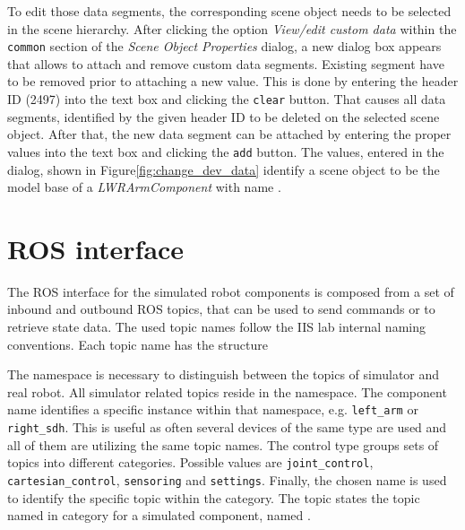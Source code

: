 To edit those data segments, the corresponding scene object needs to be selected in the scene hierarchy. After clicking the option \emph{View/edit custom data} within the \texttt{common} section of the \emph{Scene Object Properties} dialog, a new dialog box appears that allows to attach and remove custom data segments. Existing segment have to be removed prior to attaching a new value. This is done by entering the header ID (2497) into the text box and clicking the \texttt{clear} button. That causes all data segments, identified by the given header ID to be deleted on the selected scene object. After that, the new data segment can be attached by entering the proper values into the text box and clicking the \texttt{add} button. The values, entered in the dialog, shown in Figure\ref{fig:change_dev_data} identify a scene object to be the model base of a \emph{LWRArmComponent} with name .

\section{ROS interface}

The ROS interface for the simulated robot components is composed from a set of inbound and outbound ROS topics, that can be used to send commands or to retrieve state data. The used topic names follow the IIS lab internal naming conventions. Each topic name has the structure
\begin{center}
\end{center}

The namespace is necessary to distinguish between the topics of simulator and real robot. All simulator related topics reside in the  namespace. The component name identifies a specific instance within that namespace, e.g. \texttt{left\_arm} or \texttt{right\_sdh}. This is useful as often several devices of the same type are used and all of them are utilizing the same topic names. The control type groups sets of topics into different categories. Possible values are \texttt{joint\_control}, \texttt{cartesian\_control}, \texttt{sensoring} and \texttt{settings}. Finally, the chosen name is used to identify the specific topic within the category. The topic  states the topic named  in category  for a simulated component, named . \\

